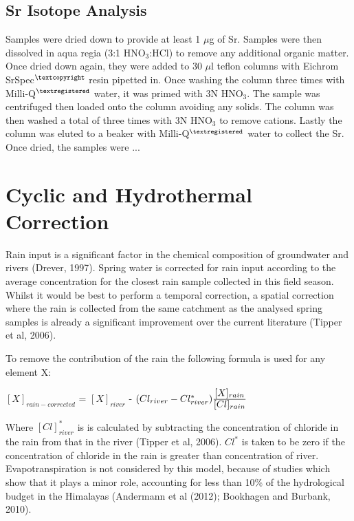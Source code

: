 
\subsection{Sr Isotope Analysis}

Samples were dried down to provide at least 1 $\mu$g of Sr. Samples were then dissolved in aqua regia (3:1 HNO$_3$:HCl) to remove any additional organic matter. Once dried down again, they were added to 30 $\mu$l teflon columns with Eichrom SrSpec$^{\textcopyright}$ resin pipetted in. Once washing the column three times with Milli-Q$^{\textregistered}$ water, it was primed with 3N HNO$_3$. The sample was centrifuged then loaded onto the column avoiding any solids. The column was then washed a total of three times with 3N HNO$_3$ to remove cations. Lastly the column was eluted to a beaker with Milli-Q$^{\textregistered}$ water to collect the Sr. Once dried, the samples were ...





\section{Cyclic and Hydrothermal Correction}

Rain input is a significant factor in the chemical composition of groundwater and rivers (Drever, 1997). Spring water is corrected for rain input according to the average concentration for the closest rain sample collected in this field season. Whilst it would be best to perform a temporal correction, a spatial correction where the rain is collected from the same catchment as the analysed spring samples is already a significant improvement over the current literature (Tipper et al, 2006).

\bsk

To remove the contribution of the rain the following formula is used for any element X:

\begin{center}
{\Large
$[X]_{rain-corrected}$  = $[X]_{river}$ - $(Cl_{river} - Cl^*_{river})\ddfrac{[X]_{rain}}{[Cl]_{rain}}$}

\end{center}

Where $[Cl]^*_{river}$ is is calculated by subtracting the concentration of chloride in the rain from that in the river (Tipper et al, 2006).
$Cl^{*}$ is taken to be zero if the concentration of chloride in the rain is greater than concentration of river. Evapotranspiration is not considered by this model, because of
studies which show that it plays a minor role, accounting for less than 10\% of the hydrological budget in the Himalayas (Andermann et al (2012); Bookhagen and Burbank, 2010).





